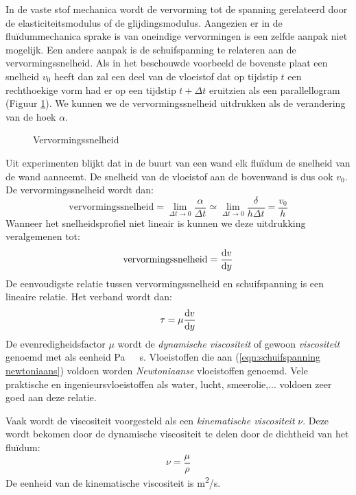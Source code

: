 In de vaste stof mechanica wordt de vervorming tot de spanning gerelateerd door de elasticiteitsmodulus of de glijdingsmodulus. Aangezien er in de fluïdummechanica sprake is van oneindige vervormingen is een zelfde aanpak niet mogelijk. Een andere aanpak is de schuifspanning te relateren aan de vervormingssnelheid. Als in het beschouwde voorbeeld de bovenste plaat een snelheid $v_0$ heeft dan zal een deel van de vloeistof dat op tijdstip $t$ een rechthoekige vorm had er op een tijdstip $t+\Delta t$ eruitzien als een parallellogram (Figuur \ref{fig:Vervormingssnelheid}). We kunnen we de vervormingssnelheid uitdrukken als de verandering van de hoek $\alpha$.
\begin{figure}[htb]
	\centering
	
	\caption{Vervormingssnelheid}
	\label{fig:Vervormingssnelheid}
\end{figure}
Uit experimenten blijkt dat in de buurt van een wand elk fluïdum de snelheid van de wand aanneemt. De snelheid van de vloeistof aan de bovenwand is dus ook $v_0$. De vervormingssnelheid wordt dan:
\begin{equation}
	\text{vervormingssnelheid} = \lim_{\Delta t \to 0} \frac{\alpha}{\Delta t} \simeq \lim_{\Delta t \to 0} \frac{\delta}{h \Delta t} = \frac{v_0}{h}
\end{equation}
Wanneer het snelheidsprofiel niet lineair is kunnen we deze uitdrukking veralgemenen tot:
\begin{equation}
	\text{vervormingssnelheid} = \frac{\mathrm{d} v}{\mathrm{d} y}
\end{equation}
De eenvoudigste relatie tussen vervormingssnelheid en schuifspanning is een lineaire relatie. Het verband wordt dan:
\begin{equation}
	\tau = \mu \frac{\mathrm{d} v}{\mathrm{d} y}
	\label{eqn:schuifspanning newtoniaans}
\end{equation}
De evenredigheidsfactor $\mu$ wordt de \emph{dynamische viscositeit} of gewoon \emph{viscositeit} genoemd met als eenheid \unit{Pa\ s}. Vloeistoffen die aan (\ref{eqn:schuifspanning newtoniaans}) voldoen worden \emph{Newtoniaanse} vloeistoffen genoemd. Vele praktische en ingenieursvloeistoffen als water, lucht, smeerolie,... voldoen zeer goed aan deze relatie.

Vaak wordt de viscositeit voorgesteld als een \emph{kinematische viscositeit} $\nu$. Deze wordt bekomen door de dynamische viscositeit te delen door de dichtheid van het fluïdum:
\begin{equation}
	\nu = \frac{\mu}{\rho}
\end{equation}
De eenheid van de kinematische viscositeit is \unit{m^2/s}.

